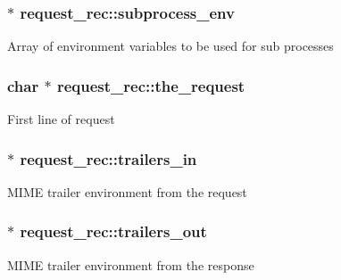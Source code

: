 \subsubsection[{\texorpdfstring{subprocess\+\_\+env}{subprocess_env}}]{$\ast$ request\+\_\+rec\+::subprocess\+\_\+env}\hypertarget{structrequest__rec_ad62304ef3728a69651588d8292c211a5}{}\label{structrequest__rec_ad62304ef3728a69651588d8292c211a5}
Array of environment variables to be used for sub processes 
\subsubsection[{\texorpdfstring{the\+\_\+request}{the_request}}]{\setlength{\rightskip}{0pt plus 5cm}char $\ast$ request\+\_\+rec\+::the\+\_\+request}\hypertarget{structrequest__rec_a57abc62ddc18e3837b7ec4638713259d}{}\label{structrequest__rec_a57abc62ddc18e3837b7ec4638713259d}
First line of request 
\subsubsection[{\texorpdfstring{trailers\+\_\+in}{trailers_in}}]{$\ast$ request\+\_\+rec\+::trailers\+\_\+in}\hypertarget{structrequest__rec_a262f0dcdb72654d48b075baa8c5421c3}{}\label{structrequest__rec_a262f0dcdb72654d48b075baa8c5421c3}
M\+I\+ME trailer environment from the request 
\subsubsection[{\texorpdfstring{trailers\+\_\+out}{trailers_out}}]{$\ast$ request\+\_\+rec\+::trailers\+\_\+out}\hypertarget{structrequest__rec_afb188ac7ef36e5da871eb7d3fb428bc0}{}\label{structrequest__rec_afb188ac7ef36e5da871eb7d3fb428bc0}
M\+I\+ME trailer environment from the response 
